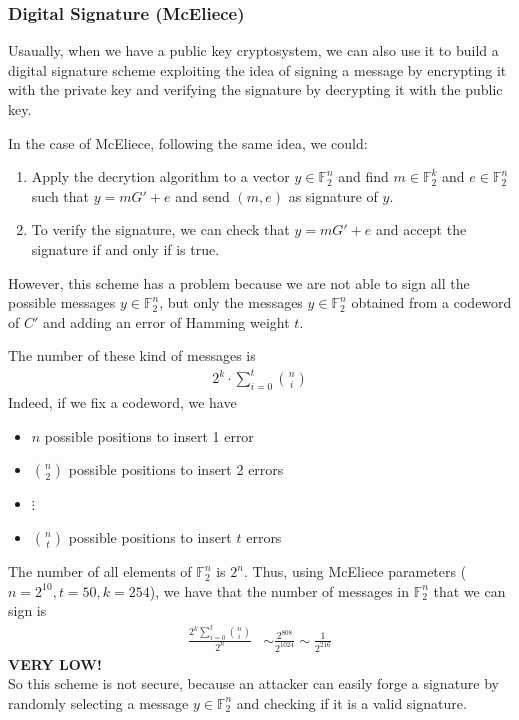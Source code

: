 \subsubsection{Digital Signature (McEliece)}
Usaually, when we have a public key cryptosystem, we can also use it to build a digital signature scheme exploiting the idea of signing a message by encrypting it with the private key and verifying the signature by decrypting it with the public key.
\bigskip

\noindent
In the case of McEliece, following the same idea, we could:
\begin{enumerate}
    \item Apply the decrytion algorithm to a vector $y \in \mathbb{F}_2^n$ and find $m \in \mathbb{F}_2^k$ and $e \in \mathbb{F}_2^n$ such that $y = mG' + e$ and send $(m, e)$ as signature of $y$.
    \item To verify the signature, we can check that $y = mG' + e$ and accept the signature if and only if is true.
\end{enumerate}
\noindent
However, this scheme has a problem because we are not able to sign all the possible messages $y \in \mathbb{F}_2^n$, but only the messages $y \in \mathbb{F}_2^n$ obtained from a codeword of $C'$ and adding an error of Hamming weight $t$.
\medskip

\noindent
The number of these kind of messages is
\begin{align*}
    2^k \cdot \sum_{i=0}^t \binom{n}{i}
\end{align*}
\noindent
Indeed, if we fix a codeword, we have
\begin{itemize}
    \item $n$ possible positions to insert 1 error
    \item $\binom{n}{2}$ possible positions to insert 2 errors
    \item $\vdots$
    \item $\binom{n}{t}$ possible positions to insert $t$ errors
\end{itemize}
\noindent
The number of all elements of $\mathbb{F}_2^n$ is $2^n$. Thus, using McEliece parameters ($n=2^{10}, t = 50, k = 254$), we have that the number of messages in $\mathbb{F}_2^n$ that we can sign is
\begin{align*}
    \frac{2^k \sum_{i=0}^t \binom{n}{i}}{2^n} &\sim \frac{2^{808}}{2^{1024}} \sim \frac{1}{2^{216}}
\end{align*}
\noindent
\textbf{VERY LOW!} \\
So this scheme is not secure, because an attacker can easily forge a signature by randomly selecting a message $y \in \mathbb{F}_2^n$ and checking if it is a valid signature.


